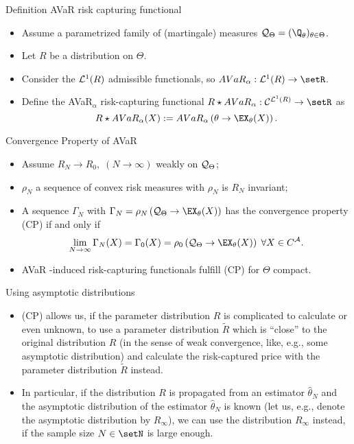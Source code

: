 {Definition AVaR risk capturing functional}
\begin{itemize}
\item Assume a  parametrized family of (martingale) measures ${\cal Q}_\Theta = (\Q_\theta)_{\theta \in \Theta}$.
\item Let $R$ be a distribution on $\Theta$.
\item Consider the ${\cal L}^1(R)$ admissible functionals, so $AVaR_\alpha:  {\cal L}^1(R) \rightarrow \setR$.
\item Define the AVaR$_\alpha$ risk-capturing functional
$
R \star AVaR_\alpha: {\cal C}^{{\cal L}^1(R)}\rightarrow \setR
$
as
$$
R \star AVaR_\alpha(X) := AVaR_\alpha\left(\theta \rightarrow \EX_\theta(X) \right).
$$
\end{itemize}

{Convergence Property of AVaR}
\begin{itemize}
\item Assume $R_N \rightarrow R_0, \; (N\rightarrow \infty) $ weakly on ${\cal Q}_\Theta$;
\item $\rho_N$ a sequence of convex risk measures with $\rho_N$ is $R_N$ invariant;
\item A sequence $\Gamma_N$ with $\Gamma_N= \rho_N\left({\cal Q}_\Theta \rightarrow \EX_\theta(X) \right)$ has the convergence property (CP) if and only if
$$
\lim_{N \rightarrow \infty} \Gamma_N(X) = \Gamma_0(X) = \rho_0 \left({\cal Q}_\Theta \rightarrow \EX_\theta(X) \right) \; \forall X \in C^{\cal A}.
$$
\item AVaR -induced risk-capturing functionals fulfill (CP) for $\Theta$ compact.
\end{itemize}

{Using asymptotic distributions}
\begin{itemize}
\item (CP) allows us, if the parameter distribution $R$ is complicated to calculate or even unknown, to use a parameter distribution $\tilde{R}$ which is ``close'' to the original distribution $R$ (in the sense of weak convergence, like, e.g., some asymptotic distribution) and calculate the risk-captured price with the parameter distribution $\tilde{R}$ instead.
\item In particular, if the distribution $R$ is propagated from an estimator $\hat{\theta}_N$ and the asymptotic distribution of the estimator $\hat{\theta}_N$ is known (let us, e.g., denote the asymptotic distribution by $R_\infty$), we can use the distribution $R_\infty$ instead, if the sample size $N\in\setN$ is large enough.
\end{itemize}

